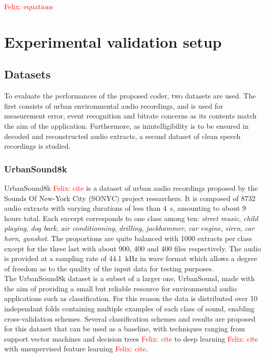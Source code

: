 \documentclass[12pt,times,onecolumn]{article}
\newcommand{\fg}[1]{\textcolor{red}{ Felix: #1}}
\begin{document}
\fg{equations}

\section{Experimental validation setup}
\subsection{Datasets}
To evaluate the performances of the proposed coder, two datasets are used. The first consists of urban environmental audio recordings, and is used for measurement error, event recognition and bitrate concerns as its contents match the aim of the application. Furthermore, as inintelligibility is to be ensured in decoded and reconstructed audio extracts, a second dataset of clean speech recordings is studied.

\subsubsection{UrbanSound8k}
UrbanSound8k \fg{cite} is a dataset of urban audio recordings proposed by the Sounds Of New-York City (SONYC) project researchers. It is composed of 8732 audio extracts with varying durations of less than 4~s, amounting to about 9 hours total. Each excerpt corresponds to one class among ten: \textit{street music}, \textit{child playing}, \textit{dog bark}, \textit{air conditionning}, \textit{drilling}, \textit{jackhammer}, \textit{car engine}, \textit{siren}, \textit{car horn}, \textit{gunshot}. The proportions are quite balanced with 1000 extracts per class except for the three last with about 900, 400 and 400 files respectively. The audio is provided at a sampling rate of 44.1~kHz in wave format which allows a degree of freedom as to the quality of the input data for testing purposes.\\

The UrbanSound8k dataset is a subset of a larger one, UrbanSound, made with the aim of providing a small but reliable resource for environmental audio applications such as classification. For this reason the data is distributed over 10 independant folds containing multiple examples of each class of sound, enabling cross-validation schemes. Several classification schemes and results are proposed for this dataset that can be used as a baseline, with techniques ranging from support vector machines and decision trees \fg{cite} to deep learning \fg{cite} with unsupervised feature learning \fg{cite}.
\end{document}
